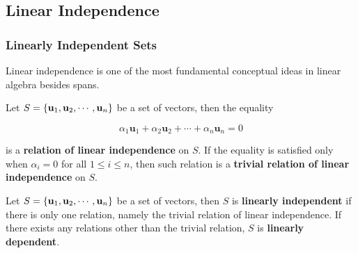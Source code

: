 \documentclass[a4paper,12pt]{article}
\begin{document}
\subsection{Linear Independence}
\subsubsection{Linearly Independent Sets}
Linear independence is one of the most fundamental conceptual ideas in linear
algebra besides spans.\n

\begin{dft}
  Let $S=\left\{ \mathbf{u}_{1},\mathbf{u}_{2},\cdots,\mathbf{u}_{n}\right\}$ be a set of vectors, then the equality

  $$\alpha_{1}\mathbf{u}_{1}+\alpha_{2}\mathbf{u}_{2}+\cdots+\alpha_{n}\mathbf{u}_{n}=0$$\s

  is a \textbf{relation of linear independence} on $S$. If the equality is satisfied only when $\alpha_{i}=0$ for all $1\leq i\leq n$, then such relation is a \textbf{trivial relation of linear independence} on $S$.
\end{dft}\n

\begin{dft}
  Let $S=\left\{ \mathbf{u}_{1},\mathbf{u}_{2},\cdots,\mathbf{u}_{n}\right\}$ be a set of vectors, then $S$ is \textbf{linearly independent} if there is only one relation, namely the trivial relation of linear independence. If there exists any relations other than the trivial relation, $S$ is \textbf{linearly dependent}.
\end{dft}\n
\end{document}
